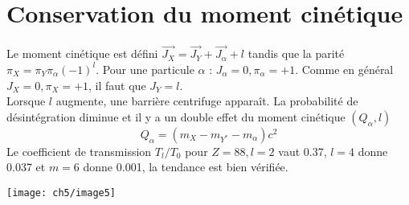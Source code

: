 \section{Conservation du moment cinétique}
Le moment cinétique est défini $\vec{J_X}=\vec{J_Y}+\vec{J_\alpha}+l$ tandis que la parité $\pi_X=\pi_Y\pi_\alpha
(-1)^l$. Pour une particule $\alpha$ : $J_\alpha=0, \pi_\alpha=+1$. Comme en général $J_X=0, \pi_X=+1$, il faut 
que $J_Y=l$.\\

Lorsque $l$ augmente, une barrière centrifuge apparaît. La probabilité de désintégration diminue et il y a un
double effet du moment cinétique $(Q_\alpha,l)$
\begin{equation}
Q_\alpha = (m_X-m_{Y^*}-m_\alpha)c^2
\end{equation}
Le coefficient de transmission $T_l/T_0$ pour $Z=88,l=2$ vaut 0.37, $l=4$ donne 0.037 et $m=6$ donne 0.001, la
tendance est bien vérifiée.\\


\begin{center}
	\texttt{[image: ch5/image5]}
\end{center}